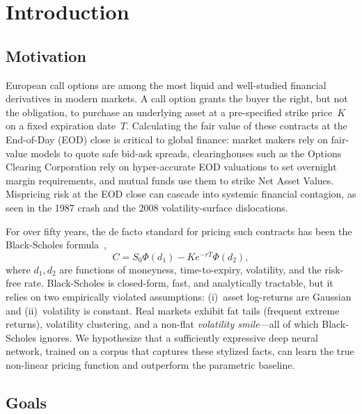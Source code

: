 \documentclass[conference]{IEEEtran}
\begin{document}
\section{Introduction}

\subsection{Motivation}

European call options are among the most liquid and well-studied
financial derivatives in modern markets. A call option grants
the buyer the right, but not the obligation, to purchase an
underlying asset at a pre-specified strike price~$K$ on a fixed
expiration date~$T$. Calculating the fair value of these
contracts at the End-of-Day (EOD) close is critical to global
finance: market makers rely on fair-value models to quote safe
bid-ask spreads, clearinghouses such as the Options Clearing
Corporation rely on hyper-accurate EOD valuations to set
overnight margin requirements, and mutual funds use them to
strike Net Asset Values. Mispricing risk at the EOD close can
cascade into systemic financial contagion, as seen in the 1987
crash and the 2008 volatility-surface dislocations.

For over fifty years, the de facto standard for pricing such
contracts has been the Black-Scholes formula~\cite{black1973pricing},
\begin{equation}
C = S_0 \Phi(d_1) - K e^{-rT}\Phi(d_2),
\end{equation}
where $d_1, d_2$ are functions of moneyness, time-to-expiry,
volatility, and the risk-free rate. Black-Scholes is closed-form,
fast, and analytically tractable, but it relies on two
empirically violated assumptions: (i)~asset log-returns are
Gaussian and (ii)~volatility is constant. Real markets exhibit
fat tails (frequent extreme returns), volatility clustering, and
a non-flat \emph{volatility smile}---all of which Black-Scholes
ignores. We hypothesize that a sufficiently expressive deep
neural network, trained on a corpus that captures these stylized
facts, can learn the true non-linear pricing function and
outperform the parametric baseline.

\subsection{Goals}
\end{document}
